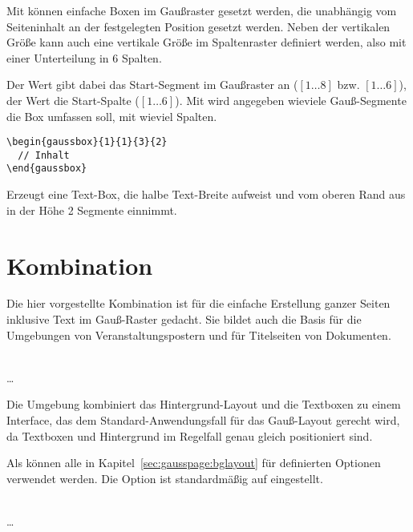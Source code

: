 Mit  können einfache Boxen im Gaußraster gesetzt werden,
die unabhängig vom Seiteninhalt an der festgelegten Position gesetzt werden.
Neben der vertikalen Größe kann auch eine vertikale Größe im Spaltenraster
definiert werden, also mit einer Unterteilung in 6 Spalten.

Der Wert  gibt dabei das Start-Segment im Gaußraster an
($[1\ldots 8]$ bzw. $[1\ldots6]$),
der Wert  die Start-Spalte ($[1\ldots6]$).
Mit  wird angegeben wieviele Gauß-Segmente die Box umfassen soll,
mit  wieviel Spalten.

\begin{Example}
  \begin{lstlisting}
\begin{gaussbox}{1}{1}{3}{2}
  // Inhalt
\end{gaussbox}
  \end{lstlisting}
  Erzeugt eine Text-Box, die halbe Text-Breite aufweist und vom oberen
  Rand aus in der Höhe 2 Segmente einnimmt.
\end{Example}


\section{Kombination}

Die hier vorgestellte Kombination ist für die einfache Erstellung ganzer Seiten
inklusive Text im Gauß-Raster gedacht.
Sie bildet auch die Basis für die Umgebungen von Veranstaltungspostern und
für Titelseiten von Dokumenten.

\begin{Declaration}
    \\
  \quad\dots\\
\end{Declaration}

Die Umgebung  kombiniert das Hintergrund-Layout
und die Textboxen zu einem Interface, das dem Standard-Anwendungsfall für
das Gauß-Layout gerecht wird, da Textboxen und Hintergrund im Regelfall
genau gleich positioniert sind.

Als  können alle in Kapitel~\ref{sec:gausspage:bglayout}
für  definierten Optionen verwendet werden.
Die Option  ist standardmäßig auf 
eingestellt.%

\begin{Declaration}
    \\
  \quad\dots\\
\end{Declaration}

